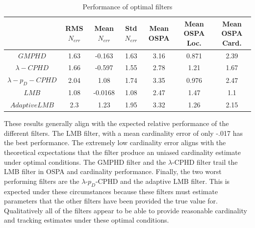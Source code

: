 \documentclass{article}
\begin{document}
\begin{table}[H]
  \centering
  \begin{tabular}{ c | c| c| c| c| c| c }
    & RMS $N_{err}$ & Mean $N_{err}$ & Std $N_{err}$ & Mean OSPA & Mean OSPA Loc. & Mean OSPA Card.\\
    \hline
    $GMPHD$ & 1.63 & -0.163 & 1.63 & 3.16 & 0.871 & 2.39 \\ 
    $\lambda-CPHD$ & 1.66 & -0.597 & 1.55 & 2.78 & 1.21 & 1.67 \\ 
    $\lambda-p_D-CPHD$ & 2.04 & 1.08 & 1.74 & 3.35 & 0.976 & 2.47 \\ 
    $LMB$ & 1.08 & -0.0168 & 1.08 & 2.47 & 1.47 & 1.1 \\ 
    $Adaptive LMB$ & 2.3 & 1.23 & 1.95 & 3.32 & 1.26 & 2.15 \\ 
  \end{tabular}
  \caption{Performance of optimal filters}
  \label{tab:optimal}
\end{table}
These results generally align with the expected relative performance of the different filters. The LMB filter, with a mean cardinality error of only -.017 has the best performance. The extremely low cardinality error aligns with the theoretical expectations that the filter produce an uniased cardinality estimate under optimal conditions. The GMPHD filter and the $\lambda$-CPHD filter trail the LMB filter in OSPA and cardinality performance. Finally, the two worst performing filters are the $\lambda$-$p_D$-CPHD and the adaptive LMB filter. This is expected under these circumstances because these filters must estimate parameters that the other filters have been provided the true value for. Qualitatively all of the filters appear to be able to provide reasonable cardinality and tracking estimates under these optimal conditions.
\end{document}
